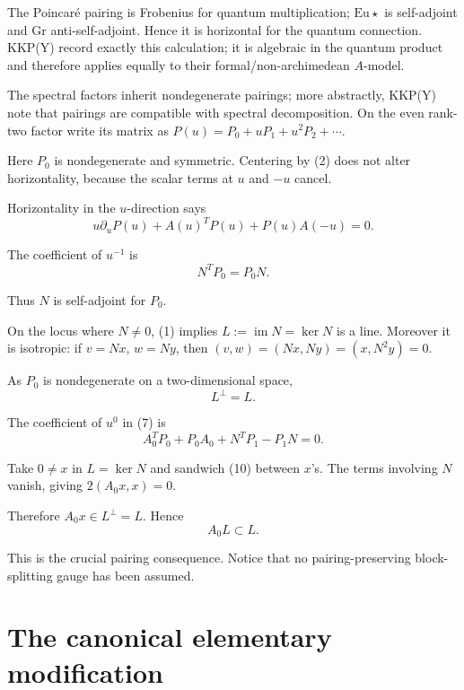 \documentclass[11pt]{article}
\theoremstyle{definition}
\theoremstyle{remark}
\begin{document}
The Poincar\'e pairing is Frobenius for quantum multiplication;
$\mathrm{Eu}\star$ is self-adjoint and $\mathrm{Gr}$ anti-self-adjoint. Hence it
is horizontal for the quantum connection. KKP(Y) record exactly this
calculation; it is algebraic in the quantum product and therefore applies
equally to their formal/non-archimedean $A$-model.

The spectral factors inherit nondegenerate pairings; more abstractly, KKP(Y)
note that pairings are compatible with spectral decomposition. On the even
rank-two factor write its matrix as $P(u)=P_0+uP_1+u^2P_2+\cdots$.

Here $P_0$ is nondegenerate and symmetric. Centering by (2) does not alter
horizontality, because the scalar terms at $u$ and $-u$ cancel.

Horizontality in the $u$-direction says
\begin{equation}
  u\partial_uP(u)+A(u)^TP(u)+P(u)A(-u)=0.
  \tag{7}
\end{equation}

The coefficient of $u^{-1}$ is
\begin{equation}
  N^TP_0=P_0N.
  \tag{8}
\end{equation}

Thus $N$ is self-adjoint for $P_0$.

On the locus where $N\ne0$, (1) implies $L:=\operatorname{im}N=\ker N$ is a
line. Moreover it is isotropic: if $v=Nx$, $w=Ny$, then
$(v,w)=(Nx,Ny)=(x,N^2y)=0$.

As $P_0$ is nondegenerate on a two-dimensional space,
\begin{equation}
  L^\perp=L.
  \tag{9}
\end{equation}

The coefficient of $u^0$ in (7) is
\begin{equation}
  A_0^TP_0+P_0A_0+N^TP_1-P_1N=0.
  \tag{10}
\end{equation}

Take $0\ne x$ in $L=\ker N$ and sandwich (10) between $x$'s. The terms involving
$N$ vanish, giving $2(A_0x,x)=0$.

Therefore $A_0x\in L^\perp=L$. Hence
\begin{equation}
  \boxed{\,A_0L\subset L.\,}
  \tag{11}
\end{equation}

This is the crucial pairing consequence. Notice that no pairing-preserving
block-splitting gauge has been assumed.

\section{The canonical elementary modification}
\end{document}
